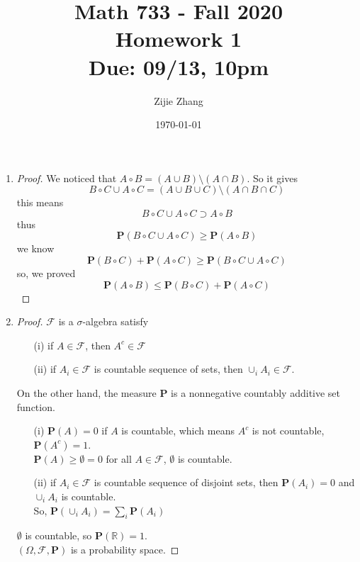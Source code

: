\documentclass{article}
\title{Math 733 - Fall 2020\\
        {\Large \textbf{Homework 1}}\\
        {\normalsize \textbf{Due: 09/13, 10pm}}
    }
\author{Zijie Zhang}
\date{\today}
\begin{document}
    \maketitle
    \begin{enumerate}
        \item \begin{proof}
            We noticed that $A \circ B = (A \cup B) \setminus (A \cap B)$. So it
            gives
            $$B \circ C \cup A \circ C = (A \cup B \cup C) 
                \setminus (A \cap B \cap C)$$
            this means
            $$B \circ C \cup A \circ C \supset A \circ B$$
            thus
            $$\mathbf{P}(B \circ C \cup A \circ C) 
                \geqslant \mathbf{P}(A \circ B)$$
            we know
            $$\mathbf{P}(B \circ C) + \mathbf{P}(A \circ C)
                \geqslant \mathbf{P}(B \circ C \cup A \circ C)$$
            so, we proved
            $$\mathbf{P}(A \circ B) \leqslant
                \mathbf{P}(B \circ C) + \mathbf{P}(A \circ C)$$
        \end{proof}

        \item \begin{proof}
            $\mathcal{F}$ is a $\sigma$-algebra satisfy
            \begin{itemize}
                \item[(i)] if $A \in \mathcal{F}$, then $A^c \in \mathcal{F}$
                \item[(ii)] if $A_i \in \mathcal{F}$ is countable sequence of sets, then $\cup_i A_i \in \mathcal{F}$. 
            \end{itemize}
            On the other hand, the measure $\mathbf{P}$ is a nonnegative countably additive set function.
            \begin{itemize}
                \item[(i)] $\mathbf{P}(A)=0$ if $A$ is countable, which means $A^c$ is not countable, $\mathbf{P}(A^c)=1$.\\
                            $\mathbf{P}(A) \geqslant \mathbf{\emptyset} = 0$ for all $A\in \mathcal{F}$, $\emptyset$ is countable.
                \item[(ii)] if $A_i\in \mathcal{F}$ is countable sequence of disjoint sets, then $\mathbf{P}(A_i)=0$ and $\cup_i A_i$ is countable.\\
                            So, $\mathbf{P}(\cup_i A_i) = \sum_i \mathbf{P}(A_i)$
            \end{itemize}
            $\emptyset$ is countable, so $\mathbf{P}(\mathbb{R}) = 1$. \\
            $(\Omega,\mathcal{F},\mathbf{P})$ is a probability space.
        \end{proof}


\end{enumerate}
\end{document}
